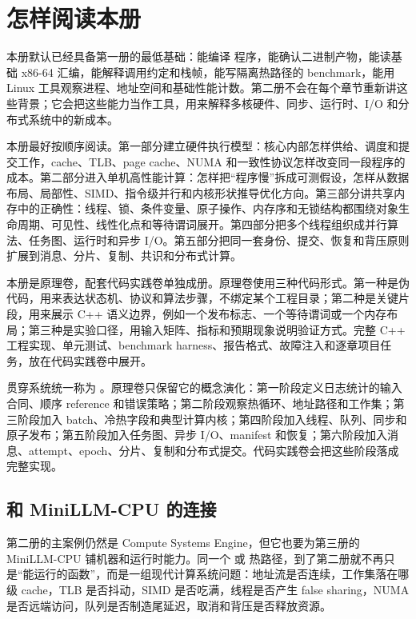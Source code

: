 \chapter*{怎样阅读本册}

本册默认已经具备第一册的最低基础：能编译 \cpp 程序，能确认二进制产物，能读基础 x86-64 汇编，能解释调用约定和栈帧，能写隔离热路径的 benchmark，能用 Linux 工具观察进程、地址空间和基础性能计数。第二册不会在每个章节重新讲这些背景；它会把这些能力当作工具，用来解释多核硬件、同步、运行时、I/O 和分布式系统中的新成本。

本册最好按顺序阅读。第一部分建立硬件执行模型：核心内部怎样供给、调度和提交工作，cache、TLB、page cache、NUMA 和一致性协议怎样改变同一段程序的成本。第二部分进入单机高性能计算：怎样把“程序慢”拆成可测假设，怎样从数据布局、局部性、SIMD、指令级并行和内核形状推导优化方向。第三部分讲共享内存中的正确性：线程、锁、条件变量、原子操作、内存序和无锁结构都围绕对象生命周期、可见性、线性化点和等待谓词展开。第四部分把多个线程组织成并行算法、任务图、运行时和异步 I/O。第五部分把同一套身份、提交、恢复和背压原则扩展到消息、分片、复制、共识和分布式计算。

本册是原理卷，配套代码实践卷单独成册。原理卷使用三种代码形式。第一种是伪代码，用来表达状态机、协议和算法步骤，不绑定某个工程目录；第二种是关键片段，用来展示 C++ 语义边界，例如一个发布标志、一个等待谓词或一个内存布局；第三种是实验口径，用输入矩阵、指标和预期现象说明验证方式。完整 C++ 工程实现、单元测试、benchmark harness、报告格式、故障注入和逐章项目任务，放在代码实践卷中展开。

贯穿系统统一称为 。原理卷只保留它的概念演化：第一阶段定义日志统计的输入合同、顺序 reference 和错误策略；第二阶段观察热循环、地址路径和工作集；第三阶段加入 batch、冷热字段和典型计算内核；第四阶段加入线程、队列、同步和原子发布；第五阶段加入任务图、异步 I/O、manifest 和恢复；第六阶段加入消息、attempt、epoch、分片、复制和分布式提交。代码实践卷会把这些阶段落成完整实现。

\section*{和 MiniLLM-CPU 的连接}

第二册的主案例仍然是 Compute Systems Engine，但它也要为第三册的 MiniLLM-CPU 铺机器和运行时能力。同一个  或  热路径，到了第二册就不再只是“能运行的函数”，而是一组现代计算系统问题：地址流是否连续，工作集落在哪级 cache，TLB 是否抖动，SIMD 是否吃满，线程是否产生 false sharing，NUMA 是否远端访问，队列是否制造尾延迟，取消和背压是否释放资源。

